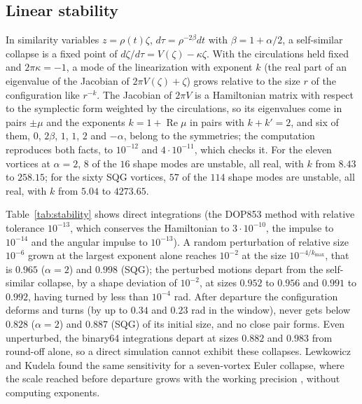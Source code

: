 \documentclass[11pt]{article}
\theoremstyle{definition}
\newcommand{\re}{\operatorname{Re}}
\begin{document}
\subsection{Linear stability}\label{sec:stability}

In similarity variables $z = \rho(t)\zeta$, $d\tau = \rho^{-2\beta}dt$ with $\beta = 1 + \alpha/2$, a self-similar collapse is a fixed point of $d\zeta/d\tau = V(\zeta) - \kappa\zeta$. With the circulations held fixed and $2\pi\kappa = -1$, a mode of the linearization with exponent $k$ (the real part of an eigenvalue of the Jacobian of $2\pi V(\zeta) + \zeta$) grows relative to the size $r$ of the configuration like $r^{-k}$. The Jacobian of $2\pi V$ is a Hamiltonian matrix with respect to the symplectic form weighted by the circulations, so its eigenvalues come in pairs $\pm\mu$ and the exponents $k = 1 + \re\mu$ in pairs with $k + k' = 2$, and six of them, $0$, $2\beta$, $1$, $1$, $2$ and $-\alpha$, belong to the symmetries; the computation reproduces both facts, to $10^{-12}$ and $4 \cdot 10^{-11}$, which checks it. For the eleven vortices at $\alpha = 2$, $8$ of the $16$ shape modes are unstable, all real, with $k$ from $8.43$ to $258.15$; for the sixty SQG vortices, $57$ of the $114$ shape modes are unstable, all real, with $k$ from $5.04$ to $4273.65$.

Table~\ref{tab:stability} shows direct integrations (the DOP853 method with relative tolerance $10^{-13}$, which conserves the Hamiltonian to $3 \cdot 10^{-10}$, the impulse to $10^{-14}$ and the angular impulse to $10^{-13}$). A random perturbation of relative size $10^{-6}$ grown at the largest exponent alone reaches $10^{-2}$ at the size $10^{-4/k_{\max}}$, that is $0.965$ ($\alpha = 2$) and $0.998$ (SQG); the perturbed motions depart from the self-similar collapse, by a shape deviation of $10^{-2}$, at sizes $0.952$ to $0.956$ and $0.991$ to $0.992$, having turned by less than $10^{-4}$ rad. After departure the configuration deforms and turns (by up to $0.34$ and $0.23$ rad in the window), never gets below $0.828$ ($\alpha = 2$) and $0.887$ (SQG) of its initial size, and no close pair forms. Even unperturbed, the binary64 integrations depart at sizes $0.882$ and $0.983$ from round-off alone, so a direct simulation cannot exhibit these collapses. Lewkowicz and Kudela found the same sensitivity for a seven-vortex Euler collapse, where the scale reached before departure grows with the working precision \cite{lk2015}, without computing exponents.
\end{document}
